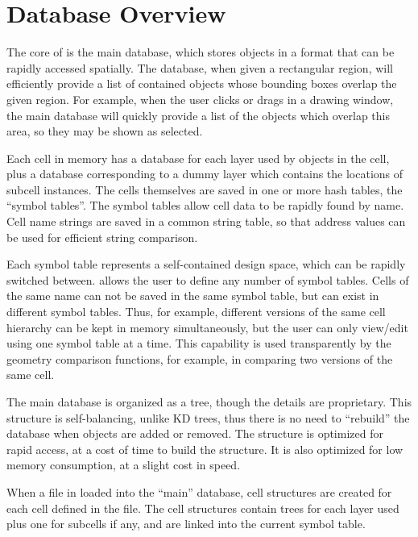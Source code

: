 \section{Database Overview}

The core of {\Xic} is the main database, which stores objects in a
format that can be rapidly accessed spatially.  The database, when
given a rectangular region, will efficiently provide a list of
contained objects whose bounding boxes overlap the given region.  For
example, when the user clicks or drags in a drawing window, the main
database will quickly provide a list of the objects which overlap this
area, so they may be shown as selected.

Each cell in memory has a database for each layer used by objects in
the cell, plus a database corresponding to a dummy layer which
contains the locations of subcell instances.  The cells themselves are
saved in one or more hash tables, the ``symbol tables''.  The symbol
tables allow cell data to be rapidly found by name.  Cell name strings
are saved in a common string table, so that address values can be used
for efficient string comparison.

Each symbol table represents a self-contained design space, which can
be rapidly switched between.  {\Xic} allows the user to define any
number of symbol tables.  Cells of the same name can not be saved in
the same symbol table, but can exist in different symbol tables. 
Thus, for example, different versions of the same cell hierarchy can
be kept in memory simultaneously, but the user can only view/edit
using one symbol table at a time.  This capability is used
transparently by the geometry comparison functions, for example, in
comparing two versions of the same cell.

The main database is organized as a tree, though the details are
proprietary.  This structure is self-balancing, unlike KD trees, thus
there is no need to ``rebuild'' the database when objects are added or
removed.  The structure is optimized for rapid access, at a cost of
time to build the structure.  It is also optimized for low memory
consumption, at a slight cost in speed.

When a file in loaded into the {\Xic} ``main'' database, cell
structures are created for each cell defined in the file.  The cell
structures contain trees for each layer used plus one for subcells if
any, and are linked into the current symbol table.

